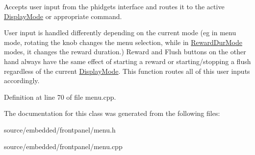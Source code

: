 Accepts user input from the phidgets interface and routes it to the active \hyperlink{class_display_mode}{Display\-Mode} or appropriate command. 

User input is handled differently depending on the current mode (eg in menu mode, rotating the knob changes the menu selection, while in \hyperlink{class_reward_dur_mode}{Reward\-Dur\-Mode} modes, it changes the reward duration.) Reward and Flush buttons on the other hand always have the same effect of starting a reward or starting/stopping a flush regardless of the current \hyperlink{class_display_mode}{Display\-Mode}. This function routes all of this user inputs accordingly. 

Definition at line 70 of file menu.\-cpp.



The documentation for this class was generated from the following files\-:\begin{DoxyCompactItemize}
\item 
source/embedded/frontpanel/menu.\-h\item 
source/embedded/frontpanel/menu.\-cpp\end{DoxyCompactItemize}
